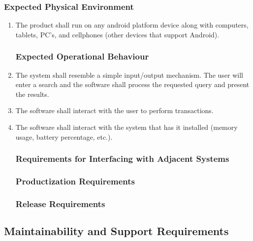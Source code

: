 \documentclass[]{article}
\begin{document}
\subsubsection{Expected Physical Environment}
\label{ssub:expected_physical_environment}
\begin{enumerate}[{OE}1. ]
	\item The product shall run on any android platform device along with computers, tablets, PC’s, and cellphones (other devices that support Android).

\subsubsection{Expected Operational Behaviour}
\label{ssub:expected_operational_behaviour}
	\item The system shall resemble a simple input/output mechanism. The user will enter a search and the software shall process the requested query and present the results.
	\item The software shall interact with the user to perform transactions.
	\item The software shall interact with the system that has it installed (memory usage, battery percentage, etc.).


\subsubsection{Requirements for Interfacing with Adjacent Systems}
\label{ssub:requirements_for_interfacing_with_adjacent_systems}


\subsubsection{Productization Requirements}
\label{ssub:productization_requirements}


\subsubsection{Release Requirements}
\label{ssub:release_requirements}
\end{enumerate}


\subsection{Maintainability and Support Requirements}
\label{sub:maintainability_and_support_requirements}
\end{document}
